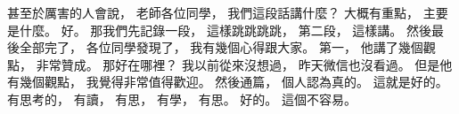 \hypertarget{w01:cue:2852}{}甚至於厲害的人會說，
\hypertarget{w01:cue:2853}{}老師各位同學，
\hypertarget{w01:cue:2854}{}我們這段話講什麼？
\hypertarget{w01:cue:2855}{}大概有重點，
\hypertarget{w01:cue:2856}{}主要是什麼。
\hypertarget{w01:cue:2857}{}好。
\hypertarget{w01:cue:2858}{}那我們先記錄一段，
\hypertarget{w01:cue:2859}{}這樣跳跳跳跳，
\hypertarget{w01:cue:2860}{}第二段，
\hypertarget{w01:cue:2861}{}這樣講。
\hypertarget{w01:cue:2862}{}然後最後全部完了，
\hypertarget{w01:cue:2863}{}各位同學發現了，
\hypertarget{w01:cue:2864}{}我有幾個心得跟大家。
\hypertarget{w01:cue:2865}{}第一，
\hypertarget{w01:cue:2866}{}他講了幾個觀點，
\hypertarget{w01:cue:2867}{}非常贊成。
\hypertarget{w01:cue:2868}{}那好在哪裡？
\hypertarget{w01:cue:2869}{}我以前從來沒想過，
\hypertarget{w01:cue:2870}{}昨天微信也沒看過。
\hypertarget{w01:cue:2871}{}但是他有幾個觀點，
\hypertarget{w01:cue:2872}{}我覺得非常值得歡迎。
\hypertarget{w01:cue:2873}{}然後通篇，
\hypertarget{w01:cue:2874}{}個人認為真的。
\hypertarget{w01:cue:2875}{}這就是好的。
\hypertarget{w01:cue:2876}{}有思考的，
\hypertarget{w01:cue:2877}{}有讀，
\hypertarget{w01:cue:2878}{}有思，
\hypertarget{w01:cue:2879}{}有學，
\hypertarget{w01:cue:2880}{}有思。
\hypertarget{w01:cue:2881}{}好的。
\hypertarget{w01:cue:2882}{}這個不容易。

